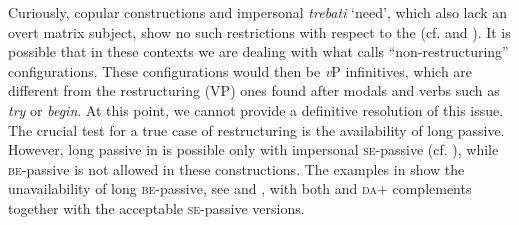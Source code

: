 \documentclass[output=paper,modfonts,newtxmath,hidelinks,]{langscibook}
\begin{document}
\ea \label{7:ex15}
	\z
\z

\noindent Curiously, copular constructions and impersonal \textit{trebati} `need', which also lack an overt matrix subject, show no such restrictions with respect to the  (cf.  and ). It is possible that in these contexts we are dealing with what \citet{Wurmbrand2003} calls “non-restructuring” configurations. These configurations would then be \textit{v}P infinitives, which are different from the restructuring (VP) ones found after modals and verbs such as \textit{try} or \textit{begin}. At this point, we cannot provide a definitive resolution of this issue. The crucial test for a true case of restructuring is the availability of long passive. However, long passive in  is possible only with impersonal \textsc{se}-passive (cf. \citealt{TodorovicWurmbrand2015}), while \textsc{be}-passive is not allowed in these constructions. The examples in  show the unavailability of long \textsc{be-}passive, see  and , with both  and \textsc{da}+ complements together with the acceptable \textsc{se-}passive versions.
\end{document}
